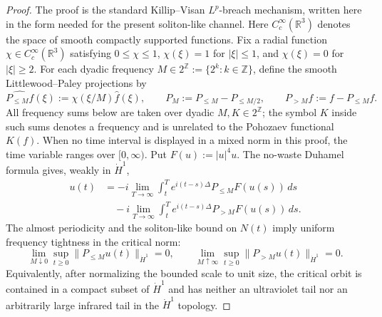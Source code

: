 \documentclass[10pt,a4paper]{amsart}
\numberwithin{equation}{section}
\newcommand{\R}{\mathbb R}
\begin{document}
\begin{proof}
The proof is the standard Killip--Visan $L^p$-breach mechanism, written here in the form needed for the present soliton-like channel. Here $C_c^\infty(\R^3)$ denotes the space of smooth compactly supported functions. Fix a radial function $\chi\in C_c^\infty(\R^3)$ satisfying $0\le\chi\le1$, $\chi(\xi)=1$ for $|\xi|\le1$, and $\chi(\xi)=0$ for $|\xi|\ge2$. For each dyadic frequency $M\in2^{\mathbb Z}:=\{2^k:k\in\mathbb Z\}$, define the smooth Littlewood--Paley projections by
\begin{equation*}
  \widehat{P_{\le M}f}(\xi):=\chi(\xi/M)\widehat f(\xi),
  \qquad
  P_M:=P_{\le M}-P_{\le M/2},
  \qquad
  P_{>M}f:=f-P_{\le M}f.
\end{equation*}
All frequency sums below are taken over dyadic $M,K\in2^{\mathbb Z}$; the symbol $K$ inside such sums denotes a frequency and is unrelated to the Pohozaev functional $K(f)$. When no time interval is displayed in a mixed norm in this proof, the time variable ranges over $[0,\infty)$. Put $F(u):=|u|^4u$. The no-waste Duhamel formula gives, weakly in $\dot H^1$,
\begin{align*}
  u(t)&=-i\lim_{T\to\infty}\int_t^T e^{i(t-s)\Delta}P_{\le M}F(u(s))\,ds \\
      &\quad -i\lim_{T\to\infty}\int_t^T e^{i(t-s)\Delta}P_{>M}F(u(s))\,ds.
\end{align*}
The almost periodicity and the soliton-like bound on $N(t)$ imply uniform frequency tightness in the critical norm:
\begin{equation*}
  \lim_{M\downarrow0}\sup_{t\ge0}\|P_{\le M}u(t)\|_{\dot H^1}=0,
  \qquad
  \lim_{M\uparrow\infty}\sup_{t\ge0}\|P_{>M}u(t)\|_{\dot H^1}=0.
\end{equation*}
Equivalently, after normalizing the bounded scale to unit size, the critical orbit is contained in a compact subset of $\dot H^1$ and has neither an ultraviolet tail nor an arbitrarily large infrared tail in the $\dot H^1$ topology.


\end{proof}
\end{document}

